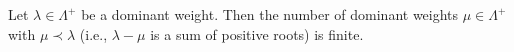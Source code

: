 Let $\lambda \in \Lambda^+$ be a dominant weight. Then the number of dominant weights $\mu \in \Lambda^+$ with $\mu \prec \lambda$ (i.e., $\lambda - \mu$ is a sum of positive roots) is finite.